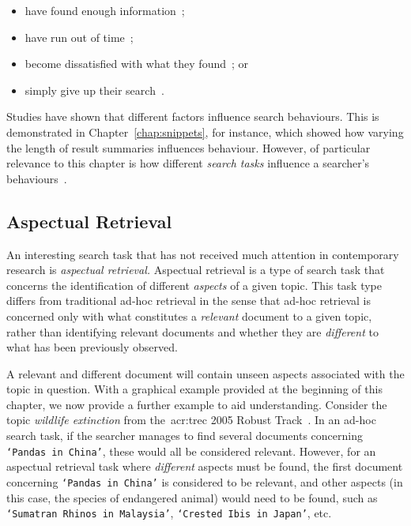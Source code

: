 \begin{itemize}
    \item{have found enough information~\citep{prabha2007enough, dostert2009satisficing, hassan2013beyond_clicks};}
    \item{have run out of time~\citep{zach2005enough_is_enough};}
    \item{become dissatisfied with what they found~\citep{kiseleva2015serp_fails}; or}
    \item{simply give up their search~\citep{diriye2012abandonment}.}
\end{itemize}

Studies have shown that different factors influence search behaviours. This is demonstrated in Chapter~\ref{chap:snippets}, for instance, which showed how varying the length of result summaries influences behaviour. However, of particular relevance to this chapter is how different \emph{search tasks} influence a searcher's behaviours~\citep{kelly2015search_tasks}.

\subsection{Aspectual Retrieval}
An interesting search task that has not received much attention in contemporary research is \emph{aspectual retrieval.} Aspectual retrieval is a type of search task that concerns the identification of different \emph{aspects} of a given topic. This task type differs from traditional ad-hoc retrieval in the sense that ad-hoc retrieval is concerned only with what constitutes a \emph{relevant} document to a given topic, rather than identifying relevant documents and whether they are \emph{different} to what has been previously observed.

A relevant and different document will contain unseen aspects associated with the topic in question. With a graphical example provided at the beginning of this chapter, we now provide a further example to aid understanding. Consider the topic \emph{wildlife extinction} from the~\gls{acr:trec} 2005 Robust Track~\citep{voorhees2006trec_robust}. In an ad-hoc search task, if the searcher manages to find several documents concerning \texttt{`Pandas in China'}, these would all be considered relevant. However, for an aspectual retrieval task where \emph{different} aspects must be found, the first document concerning \texttt{`Pandas in China'} is considered to be relevant, and other aspects (in this case, the species of endangered animal) would need to be found, such as \texttt{`Sumatran Rhinos in Malaysia'}, \texttt{`Crested Ibis in Japan'}, etc.

